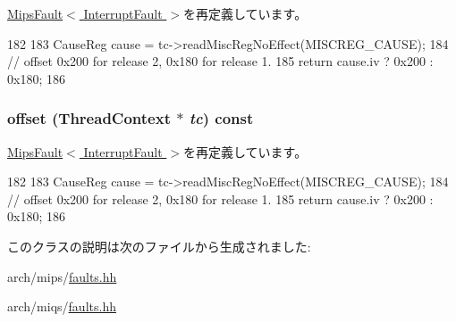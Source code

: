 \hyperlink{classMipsISA_1_1MipsFault_a9c059b781f653170e9da1d520c6d96b1}{MipsFault$<$ InterruptFault $>$}を再定義しています。


\begin{DoxyCode}
182     {
183         CauseReg cause = tc->readMiscRegNoEffect(MISCREG_CAUSE);
184         // offset 0x200 for release 2, 0x180 for release 1.
185         return cause.iv ? 0x200 : 0x180;
186     }
\end{DoxyCode}
\hypertarget{classMipsISA_1_1InterruptFault_a9c059b781f653170e9da1d520c6d96b1}{
\subsubsection[{offset}]{ offset ({\bf ThreadContext} $\ast$ {\em tc}) const}}
\label{classMipsISA_1_1InterruptFault_a9c059b781f653170e9da1d520c6d96b1}


\hyperlink{classMipsISA_1_1MipsFault_a9c059b781f653170e9da1d520c6d96b1}{MipsFault$<$ InterruptFault $>$}を再定義しています。


\begin{DoxyCode}
182     {
183         CauseReg cause = tc->readMiscRegNoEffect(MISCREG_CAUSE);
184         // offset 0x200 for release 2, 0x180 for release 1.
185         return cause.iv ? 0x200 : 0x180;
186     }
\end{DoxyCode}


このクラスの説明は次のファイルから生成されました:\begin{DoxyCompactItemize}
\item 
arch/mips/\hyperlink{arch_2mips_2faults_8hh}{faults.hh}\item 
arch/miqs/\hyperlink{arch_2miqs_2faults_8hh}{faults.hh}\end{DoxyCompactItemize}
